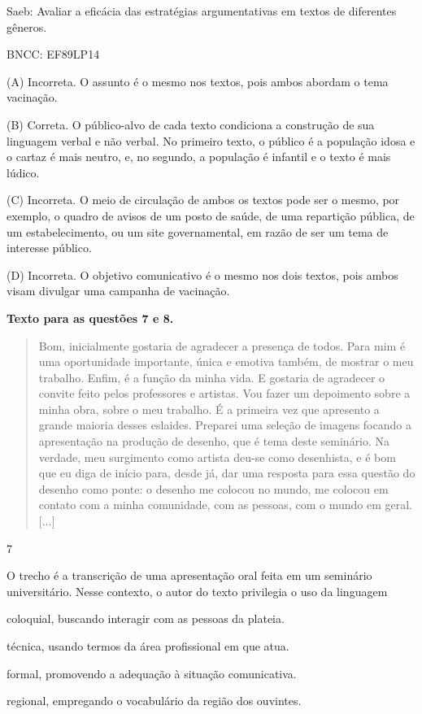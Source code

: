 Saeb: Avaliar a eficácia das estratégias argumentativas em textos de
diferentes gêneros.

BNCC: EF89LP14

(A) Incorreta. O assunto é o mesmo nos textos, pois ambos abordam o tema
vacinação.

(B) Correta. O público-alvo de cada texto condiciona a construção de sua
linguagem verbal e não verbal. No primeiro texto, o público é a
população idosa e o cartaz é mais neutro, e, no segundo, a população é
infantil e o texto é mais lúdico.

(C) Incorreta. O meio de circulação de ambos os textos pode ser o mesmo,
por exemplo, o quadro de avisos de um posto de saúde, de uma repartição
pública, de um estabelecimento, ou um site governamental, em razão de
ser um tema de interesse público.

(D) Incorreta. O objetivo comunicativo é o mesmo nos dois textos, pois
ambos visam divulgar uma campanha de vacinação.

\textbf{Texto para as questões 7 e 8.}

\begin{quote}
Bom, inicialmente gostaria de agradecer a presença de todos. Para mim é
uma oportunidade importante, única e emotiva também, de mostrar o meu
trabalho. Enfim, é a função da minha vida. E gostaria de agradecer o
convite feito pelos professores e artistas. Vou fazer um depoimento
sobre a minha obra, sobre o meu trabalho. É a primeira vez que apresento
a grande maioria desses eslaides. Preparei uma seleção de imagens
focando a apresentação na produção de desenho, que é tema deste
seminário. Na verdade, meu surgimento como artista deu-se como
desenhista, e é bom que eu diga de início para, desde já, dar uma
resposta para essa questão do desenho como ponte: o desenho me colocou
no mundo, me colocou em contato com a minha comunidade, com as pessoas,
com o mundo em geral. {[}...{]}
\end{quote}


\num{7}

O trecho é a transcrição de uma apresentação oral feita em um seminário
universitário. Nesse contexto, o autor do texto privilegia o uso da
linguagem

\begin{escolha}
\item
  coloquial, buscando interagir com as pessoas da plateia.
\item
  técnica, usando termos da área profissional em que atua.
\item
  formal, promovendo a adequação à situação comunicativa.
\item
  regional, empregando o vocabulário da região dos ouvintes.
\end{escolha}

